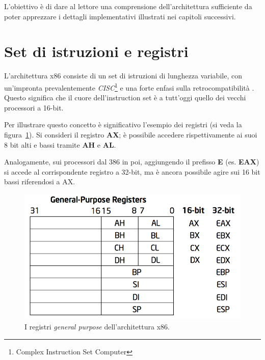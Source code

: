 \documentclass[12pt,a4paper]{report}
\begin{document}
	L'obiettivo è di dare al lettore una comprensione dell'architettura sufficiente da poter apprezzare i dettagli implementativi
	illustrati nei capitoli successivi.
	
	\section{Set di istruzioni e registri}		
		L'architettura x86 consiste di un set di istruzioni di lunghezza variabile, con un'impronta prevalentemente
		\emph{CISC}\footnote{Complex Instruction Set Computer} e una forte enfasi sulla retrocompatibilità \cite{WIKI_x86}.
		Questo significa che il cuore dell'instruction set è a tutt'oggi quello dei vecchi processori a 16-bit.
		
		Per illustrare questo concetto è significativo l'esempio dei registri (si veda la figura~\ref{fig:gpr}).
		Si consideri il registro \textbf{AX}; è possibile accedere rispettivamente ai suoi 8 bit alti e bassi tramite \textbf{AH} e \textbf{AL}.
		
		Analogamente, sui processori dal 386 in poi, aggiungendo il prefisso \textbf{E} (es. \textbf{EAX}) si accede al corrispondente
		registro a 32-bit, ma è ancora possibile agire sui 16 bit bassi riferendosi a AX.
		
		\begin{figure}[t!]
		\centering
		\includegraphics[scale=0.53]{img/gpr.png}
		\caption{I registri \emph{general purpose} dell'architettura x86. \cite{Intel}\label{fig:gpr}}
		\end{figure}
		
\end{document}
